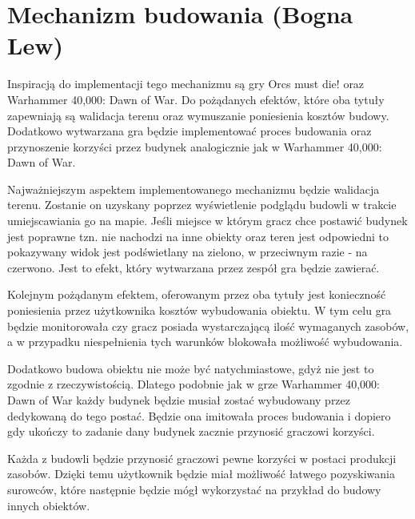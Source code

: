 \section{Mechanizm budowania (Bogna Lew)}\label{chap:build}
Inspiracją do implementacji tego mechanizmu są gry Orcs must die! oraz Warhammer 40,000: Dawn of War. Do pożądanych
efektów, które oba tytuły zapewniają są walidacja terenu oraz wymuszanie poniesienia kosztów budowy. Dodatkowo
wytwarzana gra będzie implementować proces budowania oraz przynoszenie korzyści przez budynek analogicznie jak w
Warhammer 40,000: Dawn of War.

Najważniejszym aspektem implementowanego mechanizmu będzie walidacja terenu. Zostanie on uzyskany poprzez wyświetlenie
podglądu budowli w trakcie umiejscawiania go na mapie. Jeśli miejsce w którym gracz chce postawić budynek jest poprawne
tzn. nie nachodzi na inne obiekty oraz teren jest odpowiedni to pokazywany widok jest podświetlany na zielono, w
przeciwnym razie - na czerwono. Jest to efekt, który wytwarzana przez zespół gra będzie zawierać.

Kolejnym pożądanym efektem, oferowanym przez oba tytuły jest konieczność poniesienia przez użytkownika kosztów
wybudowania obiektu. W tym celu gra będzie monitorowała czy gracz posiada wystarczającą ilość wymaganych zasobów, a w
przypadku niespełnienia tych warunków blokowała możliwość wybudowania.

Dodatkowo budowa obiektu nie może być natychmiastowe, gdyż nie jest to zgodnie z rzeczywistością. Dlatego podobnie jak w
grze Warhammer 40,000: Dawn of War każdy budynek będzie musiał zostać wybudowany przez dedykowaną do tego postać. Będzie
ona imitowała proces budowania i dopiero gdy ukończy to zadanie dany budynek zacznie przynosić graczowi korzyści.

Każda z budowli będzie przynosić graczowi pewne korzyści w postaci produkcji zasobów. Dzięki temu użytkownik będzie miał
możliwość łatwego pozyskiwania surowców, które następnie będzie mógł wykorzystać na przykład do budowy innych obiektów.
